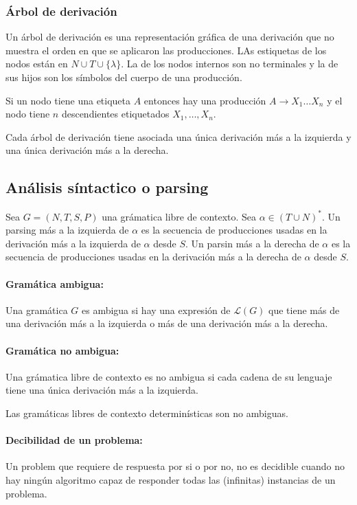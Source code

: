 \subsubsection{Árbol de derivación}
Un árbol de derivación es una representación gráfica de una derivación que no muestra el orden en que se aplicaron las producciones. LAs estiquetas de los nodos están en \(N\cup T\cup\{
\lambda\}\). La de los nodos internos son no terminales y la de sus hijos son los símbolos del cuerpo de una producción.

Si un nodo tiene una etiqueta \(A\) entonces hay una producción \(A\to X_1\dots X_n\) y el nodo tiene \(n\) descendientes etiquetados \(X_1,\dots,X_n\).

Cada árbol de derivación tiene asociada una única derivación más a la izquierda y una única derivación más a la derecha.

\subsection{Análisis síntactico o parsing}
Sea \(G = (N, T, S, P)\) una grámatica libre de contexto. Sea \(\alpha\in(T\cup N)^*\). Un parsing más a la izquierda de \(\alpha\) es la secuencia de producciones usadas en la derivación más a la izquierda de \(\alpha\) desde \(S\). Un parsin más a la derecha de \(\alpha\) es la secuencia de producciones usadas en la derivación más a la derecha de \(\alpha\) desde \(S\).

\paragraph{Gramática ambigua:} Una gramática \(G\) es ambigua si hay una expresión de \(\mathcal{L}(G)\) que tiene más de una derivación más a la izquierda o más de una derivación más a la derecha.

\paragraph{Gramática no ambigua:} Una grámatica libre de contexto es no ambigua si cada cadena de su lenguaje tiene una única derivación más a la izquierda.

Las gramáticas libres de contexto determinísticas son no ambiguas.

\paragraph{Decibilidad de un problema:} Un problem que requiere de respuesta por si o por no, no es decidible cuando no hay ningún algoritmo capaz de responder todas las (infinitas) instancias de un problema.

